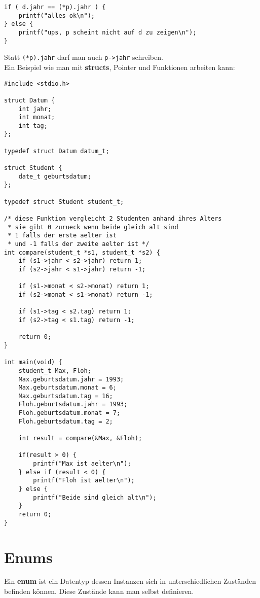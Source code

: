 \documentclass[c_worksheet.tex]{subfiles}
\begin{document}
\begin{lstlisting}[numbers=none]
if ( d.jahr == (*p).jahr ) {
    printf("alles ok\n");
} else {
    printf("ups, p scheint nicht auf d zu zeigen\n");
}
\end{lstlisting}

Statt \lstinline$(*p).jahr$ darf man auch \lstinline$p->jahr$ schreiben.\\

Ein Beispiel wie man mit \textbf{structs}, Pointer und Funktionen arbeiten kann:

\begin{lstlisting}
#include <stdio.h>

struct Datum {
    int jahr;
    int monat;
    int tag;
};

typedef struct Datum datum_t;

struct Student {
    date_t geburtsdatum;
};

typedef struct Student student_t;

/* diese Funktion vergleicht 2 Studenten anhand ihres Alters
 * sie gibt 0 zurueck wenn beide gleich alt sind
 * 1 falls der erste aelter ist
 * und -1 falls der zweite aelter ist */
int compare(student_t *s1, student_t *s2) {
    if (s1->jahr < s2->jahr) return 1;
    if (s2->jahr < s1->jahr) return -1;
    
    if (s1->monat < s2->monat) return 1;
    if (s2->monat < s1->monat) return -1;

    if (s1->tag < s2.tag) return 1;
    if (s2->tag < s1.tag) return -1;

    return 0;
}

int main(void) {
    student_t Max, Floh;
    Max.geburtsdatum.jahr = 1993;
    Max.geburtsdatum.monat = 6;
    Max.geburtsdatum.tag = 16;
    Floh.geburtsdatum.jahr = 1993;
    Floh.geburtsdatum.monat = 7;
    Floh.geburtsdatum.tag = 2;

    int result = compare(&Max, &Floh);

    if(result > 0) {
        printf("Max ist aelter\n");
    } else if (result < 0) {
        printf("Floh ist aelter\n");
    } else {
        printf("Beide sind gleich alt\n");
    }
    return 0;
}
\end{lstlisting}

\section{Enums}

Ein \textbf{enum} ist ein Datentyp dessen Instanzen sich in unterschiedlichen Zuständen befinden können. Diese Zustände kann man selbst definieren.
\end{document}
